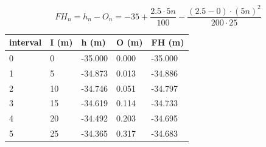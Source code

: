 \documentclass{bcrre_exam}
\begin{document}
\begin{questions}
\begin{solution}
\begin{equation}
    FH_n = h_n - O_n = -35+\frac{2.5 \cdot 5n}{100} - \frac{(2.5-0)\cdot (5n)^2}{200 \cdot 25}
\end{equation}

\vspace{1cm}

\begin{tabular}{@{}lllll@{}}
\toprule
interval & I (m) & h (m)   & O (m) & FH (m)  \\ \midrule
0        & 0     & -35.000 & 0.000 & -35.000 \\
1        & 5     & -34.873 & 0.013 & -34.886 \\
2        & 10    & -34.746 & 0.051 & -34.797 \\
3        & 15    & -34.619 & 0.114 & -34.733 \\
4        & 20    & -34.492 & 0.203 & -34.695 \\
5        & 25    & -34.365 & 0.317 & -34.683 \\ \bottomrule
\end{tabular}

\end{solution}

\end{questions}
\end{document}
